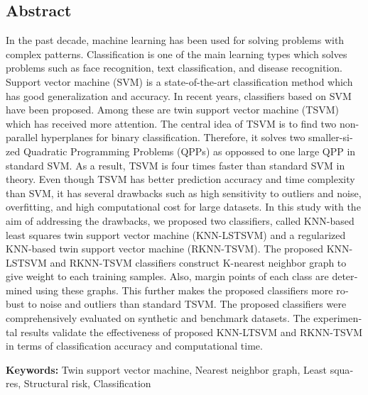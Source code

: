 \pagestyle{plain}

{}

\begin{latin}
	
\section*{Abstract}
In the past decade, machine learning has been used for solving problems with complex patterns. Classification is one of the main learning types which solves problems such as face recognition, text classification, and disease recognition. Support vector machine (SVM) is a state-of-the-art classification method which has good generalization and accuracy. In recent years, classifiers based on SVM have been proposed. Among these are twin support vector machine (TSVM) which has received more attention. The central idea of TSVM is to find two non-parallel hyperplanes for binary classification. Therefore, it solves two smaller-sized Quadratic Programming Problems (QPPs) as oppossed to one large QPP in standard SVM. As a result, TSVM is four times faster than standard SVM in theory. Even though TSVM has better prediction accuracy and time complexity than SVM, it has several drawbacks such as high sensitivity to outliers and noise, overfitting, and high computational cost for large datasets. In this study with the aim of addressing the drawbacks, we proposed two classifiers, called KNN-based least squares twin support vector machine (KNN-LSTSVM) and a regularized KNN-based twin support vector machine (RKNN-TSVM). The proposed KNN-LSTSVM and RKNN-TSVM classifiers construct K-nearest neighbor graph to give weight to each training samples. Also, margin points of each class are determined using these graphs. This further makes the proposed classifiers more robust to noise and outliers than standard TSVM. The proposed classifiers were comprehensively evaluated on synthetic and benchmark datasets. The experimental results validate the effectiveness of proposed KNN-LTSVM and RKNN-TSVM in terms of classification accuracy and computational time.
	
\vspace{2cm}
\noindent \textbf{Keywords:}
Twin support vector machine, Nearest neighbor graph, Least squares, Structural risk, Classification 
	
\end{latin}